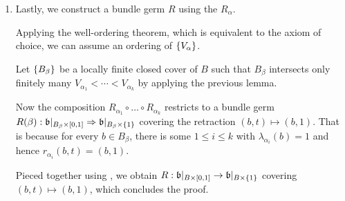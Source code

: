 \begin{scope}
\begin{myproof}
\begin{enumerate}
            \item
            Lastly, we construct a bundle germ $R$ using the $R_\alpha$.

            Applying the well-ordering theorem, which is equivalent to the axiom of choice, we can assume an ordering of $\{V_\alpha\}$.

            Let $\{B_\beta\}$ be a locally finite closed cover of $B$
            such that $B_\beta$ intersects only finitely many $V_{\alpha_1} < \cdots < V_{\alpha_k}$
            by applying the previous lemma.

            Now the composition $R_{\alpha_1} \circ \ldots \circ R_{\alpha_k}$ restricts
            to a bundle germ $R(\beta): \mathfrak{b}\vert_{B_\beta \times{} [0, 1]} \Rightarrow{} \mathfrak{b}\vert_{B_\beta \times{} \{1\}}$ covering the retraction $(b, t) \mapsto (b, 1)$.
            That is because for every $b \in B_\beta$, there is some $1 \le i \le k$ with $\lambda_{\alpha_i}(b) = 1$ and hence $r_{\alpha_i}(b, t) = (b, 1)$.
            
            Pieced together using , we obtain $R: \mathfrak{b}\vert_{B \times{} [0, 1]} \to \mathfrak{b}\vert_{B \times{} \{1\}}$ covering $(b, t) \mapsto (b, 1)$, which concludes the proof.
        \end{enumerate}    
    \end{myproof}
\end{scope}